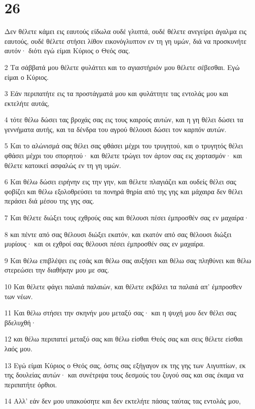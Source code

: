 \chapter{26}

\par Δεν θέλετε κάμει εις εαυτούς είδωλα ουδέ γλυπτά, ουδέ θέλετε ανεγείρει άγαλμα εις εαυτούς, ουδέ θέλετε στήσει λίθον εικονόγλυπτον εν τη γη υμών, διά να προσκυνήτε αυτόν· διότι εγώ είμαι Κύριος ο Θεός σας.
\par 2 Τα σάββατά μου θέλετε φυλάττει και το αγιαστήριόν μου θέλετε σέβεσθαι. Εγώ είμαι ο Κύριος.
\par 3 Εάν περιπατήτε εις τα προστάγματά μου και φυλάττητε τας εντολάς μου και εκτελήτε αυτάς,
\par 4 τότε θέλω δώσει τας βροχάς σας εις τους καιρούς αυτών, και η γη θέλει δώσει τα γεννήματα αυτής, και τα δένδρα του αγρού θέλουσι δώσει τον καρπόν αυτών.
\par 5 Και το αλώνισμά σας θέλει σας φθάσει μέχρι του τρυγητού, και ο τρυγητός θέλει φθάσει μέχρι του σπορητού· και θέλετε τρώγει τον άρτον σας εις χορτασμόν· και θέλετε κατοικεί ασφαλώς εν τη γη υμών.
\par 6 Και θέλω δώσει ειρήνην εις την γην, και θέλετε πλαγιάζει και ουδείς θέλει σας φοβίζει και θέλω εξολοθρεύσει τα πονηρά θηρία από της γης και μάχαιρα δεν θέλει περάσει διά μέσου της γης σας.
\par 7 Και θέλετε διώξει τους εχθρούς σας και θέλουσι πέσει έμπροσθέν σας εν μαχαίρα·
\par 8 και πέντε από σας θέλουσι διώξει εκατόν, και εκατόν από σας θέλουσι διώξει μυρίους· και οι εχθροί σας θέλουσι πέσει έμπροσθέν σας εν μαχαίρα.
\par 9 Και θέλω επιβλέψει εις εσάς και θέλω σας αυξήσει και θέλω σας πληθύνει και θέλω στερεώσει την διαθήκην μου με σας.
\par 10 Και θέλετε φάγει παλαιά παλαιών, και θέλετε εκβάλει τα παλαιά απ' έμπροσθεν των νέων.
\par 11 Και θέλω στήσει την σκηνήν μου μεταξύ σας· και η ψυχή μου δεν θέλει σας βδελυχθή·
\par 12 και θέλω περιπατεί μεταξύ σας και θέλω είσθαι Θεός σας και σεις θέλετε είσθαι λαός μου.
\par 13 Εγώ είμαι Κύριος ο Θεός σας, όστις σας εξήγαγον εκ της γης των Αιγυπτίων, εκ της δουλείας αυτών· και συνέτριψα τους δεσμούς του ζυγού σας και σας έκαμα να περιπατήτε όρθιοι.
\par 14 Αλλ' εάν δεν μου υπακούσητε και δεν εκτελήτε πάσας ταύτας τας εντολάς μου,
